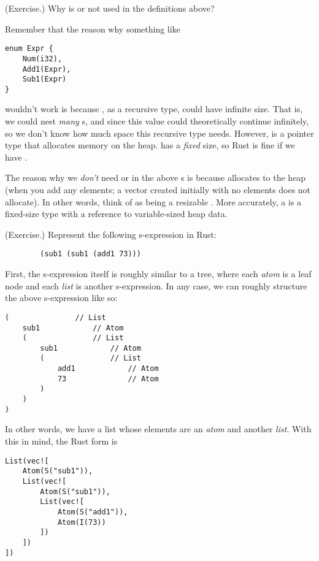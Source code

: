 \documentclass[letterpaper]{article}
\begin{document}
\begin{mdframed}
    (Exercise.) Why is  or  not used in the  definitions above? 

    \begin{mdframed}
        Remember that the reason why something like 
        \begin{verbatim}
enum Expr {
    Num(i32),
    Add1(Expr),
    Sub1(Expr)
}\end{verbatim}
        wouldn't work is because , as a recursive type, could have infinite size. That is, we could nest \emph{many} s, and since this value could theoretically continue infinitely, so we don't know how much space this recursive type needs. However,  is a pointer type that allocates memory on the heap.  has a \emph{fixed} size, so Rust is fine if we have . 

        \bigskip

        The reason why we \emph{don't} need  or  in the above s is because  allocates to the heap (when you add any elements; a vector created initially with no elements does not allocate). In other words, think of  as being a resizable . More accurately, a  is a fixed-size type with a reference to variable-sized heap data.
    \end{mdframed}
\end{mdframed}


\begin{mdframed}
    (Exercise.) Represent the following s-expression in Rust: 
    \begin{verbatim}
        (sub1 (sub1 (add1 73)))\end{verbatim}
    
    \begin{mdframed}
        First, the s-expression itself is roughly similar to a tree, where each \emph{atom} is a leaf node and each \emph{list} is another s-expression. In any case, we can roughly structure the above s-expression like so: 
        \begin{verbatim}
(               // List
    sub1            // Atom 
    (               // List 
        sub1            // Atom 
        (               // List 
            add1            // Atom 
            73              // Atom 
        )
    )
) \end{verbatim}
        In other words, we have a list whose elements are an \emph{atom} and another \emph{list}. With this in mind, the Rust form is
        \begin{verbatim}
List(vec![
    Atom(S("sub1")),
    List(vec![
        Atom(S("sub1")),
        List(vec![
            Atom(S("add1")),
            Atom(I(73))
        ])
    ])
])\end{verbatim}
    \end{mdframed}
\end{mdframed}
\end{document}
